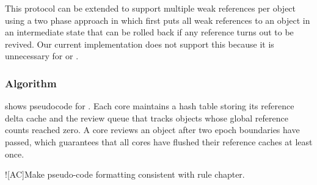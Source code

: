 This protocol can be extended to support multiple weak references per
object using a two phase approach in which  first puts
all weak references to an object in an intermediate state that can be
rolled back if any
reference turns out to be revived.  Our current implementation does
not support this because it is unnecessary for \vm or \fs.

\subsubsection{Algorithm}
 shows pseudocode for .  Each core
maintains a hash table
storing its reference delta cache and the review queue that tracks
objects whose global reference counts reached zero.  A core reviews an
object after two epoch boundaries have passed, which guarantees
that all cores have flushed their
reference caches at least once.

\XXX![AC]{Make pseudo-code formatting consistent with rule chapter.}


